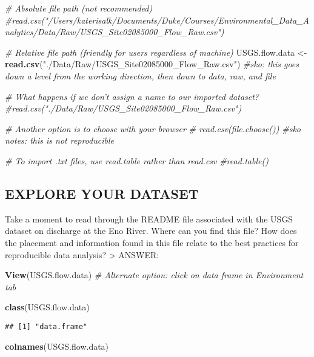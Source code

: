 \documentclass[]{article}
\newenvironment{Shaded}{\begin{snugshade}}{\end{snugshade}}
\newcommand{\KeywordTok}[1]{\textcolor[rgb]{0.13,0.29,0.53}{\textbf{#1}}}
\newcommand{\StringTok}[1]{\textcolor[rgb]{0.31,0.60,0.02}{#1}}
\newcommand{\CommentTok}[1]{\textcolor[rgb]{0.56,0.35,0.01}{\textit{#1}}}
\newcommand{\NormalTok}[1]{#1}
\begin{document}
\begin{Shaded}
\begin{Highlighting}[]
\CommentTok{# Absolute file path (not recommended)}
\CommentTok{#read.csv("/Users/katerisalk/Documents/Duke/Courses/Environmental_Data_Analytics/Data/Raw/USGS_Site02085000_Flow_Raw.csv")}

\CommentTok{# Relative file path (friendly for users regardless of machine)}
\NormalTok{USGS.flow.data <-}\StringTok{ }\KeywordTok{read.csv}\NormalTok{(}\StringTok{"./Data/Raw/USGS_Site02085000_Flow_Raw.csv"}\NormalTok{)}
\CommentTok{#sko: this goes down a level from the working direction, then down to data, raw, and file}

\CommentTok{# What happens if we don't assign a name to our imported dataset?}
\CommentTok{#read.csv("./Data/Raw/USGS_Site02085000_Flow_Raw.csv")}

\CommentTok{# Another option is to choose with your browser}
\CommentTok{# read.csv(file.choose())}
\CommentTok{#sko notes: this is not reproducible}

\CommentTok{# To import .txt files, use read.table rather than read.csv}
\CommentTok{#read.table()}
\end{Highlighting}
\end{Shaded}

\subsection{EXPLORE YOUR DATASET}\label{explore-your-dataset}

Take a moment to read through the README file associated with the USGS
dataset on discharge at the Eno River. Where can you find this file? How
does the placement and information found in this file relate to the best
practices for reproducible data analysis? \textgreater{} ANSWER:

\begin{Shaded}
\begin{Highlighting}[]
\KeywordTok{View}\NormalTok{(USGS.flow.data)}
\CommentTok{# Alternate option: click on data frame in Environment tab}

\KeywordTok{class}\NormalTok{(USGS.flow.data)}
\end{Highlighting}
\end{Shaded}

\begin{verbatim}
## [1] "data.frame"
\end{verbatim}

\begin{Shaded}
\begin{Highlighting}[]
\KeywordTok{colnames}\NormalTok{(USGS.flow.data)}
\end{Highlighting}
\end{Shaded}
\end{document}
